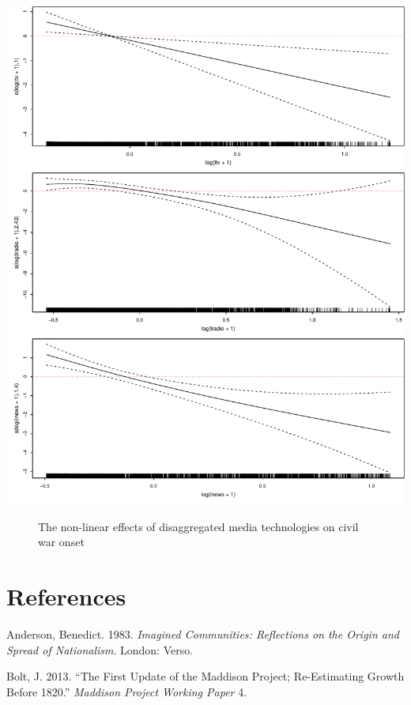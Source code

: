 \documentclass[12pt,article,oneside]{memoir}
\makeatletter
\def\maxwidth{\ifdim\Gin@nat@width>\linewidth\linewidth
\else\Gin@nat@width\fi}
\let\Oldincludegraphics\includegraphics
\renewcommand{\includegraphics}[1]{\Oldincludegraphics[width=\maxwidth]{#1}}
\makeatother
\begin{document}
\clearpage
\includegraphics{media_civil_war_files/figure-markdown/disaggregated-nonlinear.pdf}

\begin{figure}
\caption{The non-linear effects of disaggregated media technologies on civil war onset}  
\end{figure}

\pagebreak   

\section{References}\label{references}

\setlength{\parindent}{-0.2in} \setlength{\leftskip}{0.2in}
\setlength{\parskip}{8pt} \vspace*{-0.2in} \noindent

Anderson, Benedict. 1983. \emph{Imagined Communities: Reflections on the
Origin and Spread of Nationalism}. London: Verso.

Bolt, J. 2013. ``The First Update of the Maddison Project; Re-Estimating
Growth Before 1820.'' \emph{Maddison Project Working Paper} 4.
\end{document}
